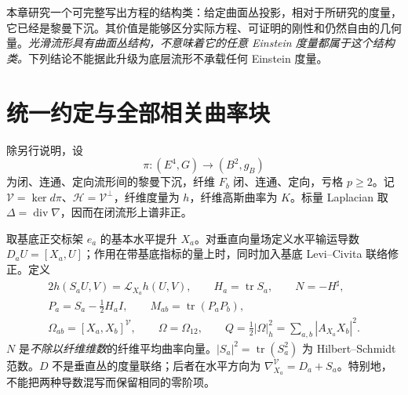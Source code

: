 \documentclass[UTF8,fontset=fandol,zihao=-4,oneside,openany]{ctexbook}
\theoremstyle{cjkplain}
\numberwithin{equation}{chapter}
\begin{document}
本章研究一个可完整写出方程的结构类：给定曲面丛投影，相对于所研究的度量，它已经是黎曼下沉。其价值是能够区分实际方程、可证明的刚性和仍然自由的几何量。\emph{光滑流形具有曲面丛结构，不意味着它的任意 Einstein 度量都属于这个结构类。}下列结论不能据此升级为底层流形不承载任何 Einstein 度量。

\section{统一约定与全部相关曲率块}

除另行说明，设
\[
\pi:(E^4,G)\longrightarrow(B^2,g_B)
\]
为闭、连通、定向流形间的黎曼下沉，纤维 $F_b$ 闭、连通、定向，亏格 $p\ge2$。记 $\mathcal V=\ker d\pi$、$\mathcal H=\mathcal V^\perp$，纤维度量为 $h$，纤维高斯曲率为 $K$。标量 Laplacian 取 $\Delta=\operatorname{div}\nabla$，因而在闭流形上谱非正。

取基底正交标架 $e_a$ 的基本水平提升 $X_a$。对垂直向量场定义水平输运导数 $D_aU=[X_a,U]$；作用在带基底指标的量上时，同时加入基底 Levi--Civita 联络修正。定义
\begin{equation}\label{SUB:notation}
\begin{gathered}
2h(S_aU,V)=\mathcal L_{X_a}h(U,V),\qquad
H_a=\operatorname{tr}S_a,\qquad N=-H^\sharp,\\
P_a=S_a-\tfrac12H_aI,\qquad
M_{ab}=\operatorname{tr}(P_aP_b),\\
\Omega_{ab}=[X_a,X_b]^{\mathcal V},\qquad
\Omega=\Omega_{12},\qquad
Q=\tfrac12|\Omega|_h^2=\sum_{a,b}|A_{X_a}X_b|^2.
\end{gathered}
\end{equation}
$N$ 是\emph{不除以纤维维数}的纤维平均曲率向量。$|S_a|^2=\operatorname{tr}(S_a^2)$ 为 Hilbert--Schmidt 范数。$D$ 不是垂直丛的度量联络；后者在水平方向为 $\nabla^{\mathcal V}_{X_a}=D_a+S_a$。特别地，不能把两种导数混写而保留相同的零阶项。
\end{document}
